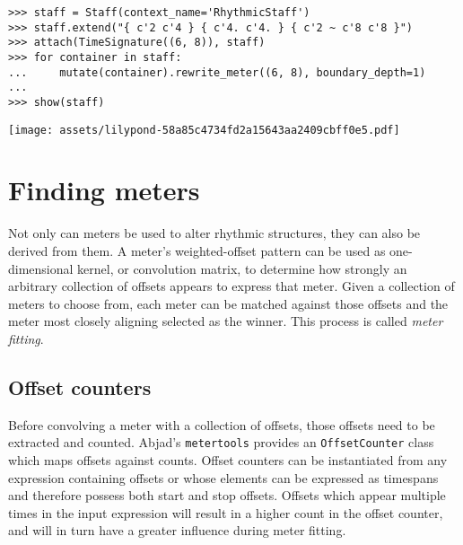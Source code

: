 \begin{comment}
<abjad>
staff = Staff(context_name='RhythmicStaff')
staff.extend("{ c'2 c'4 } { c'4. c'4. } { c'2 ~ c'8 c'8 }")
attach(TimeSignature((6, 8)), staff)
for container in staff:
    mutate(container).rewrite_meter((6, 8), boundary_depth=1)

show(staff)
</abjad>
\end{comment}

\begin{abjadbookoutput}
\begin{singlespacing}
\vspace{-0.5\baselineskip}
\begin{verbatim}
>>> staff = Staff(context_name='RhythmicStaff')
>>> staff.extend("{ c'2 c'4 } { c'4. c'4. } { c'2 ~ c'8 c'8 }")
>>> attach(TimeSignature((6, 8)), staff)
>>> for container in staff:
...     mutate(container).rewrite_meter((6, 8), boundary_depth=1)
...
>>> show(staff)
\end{verbatim}
\noindent\texttt{[image: assets/lilypond-58a85c4734fd2a15643aa2409cbff0e5.pdf]}
\end{singlespacing}
\end{abjadbookoutput}

\section{Finding meters}
\label{sec:finding-meters}

Not only can meters be used to alter rhythmic structures, they can also be
derived from them. A meter's weighted-offset pattern can be used as
one-dimensional kernel, or convolution matrix, to determine how strongly an
arbitrary collection of offsets appears to express that meter. Given a
collection of meters to choose from, each meter can be matched against those
offsets and the meter most closely aligning selected as the winner. This
process is called \emph{meter fitting}.

\subsection{Offset counters} %
\label{ssec:offset-counters}

Before convolving a meter with a collection of offsets, those offsets need to
be extracted and counted. Abjad's \texttt{metertools} provides an
\texttt{OffsetCounter} class which maps offsets against counts. Offset counters
can be instantiated from any expression containing offsets or whose elements
can be expressed as timespans and therefore possess both start and stop
offsets. Offsets which appear multiple times in the input expression will
result in a higher count in the offset counter, and will in turn have a greater
influence during meter fitting.


